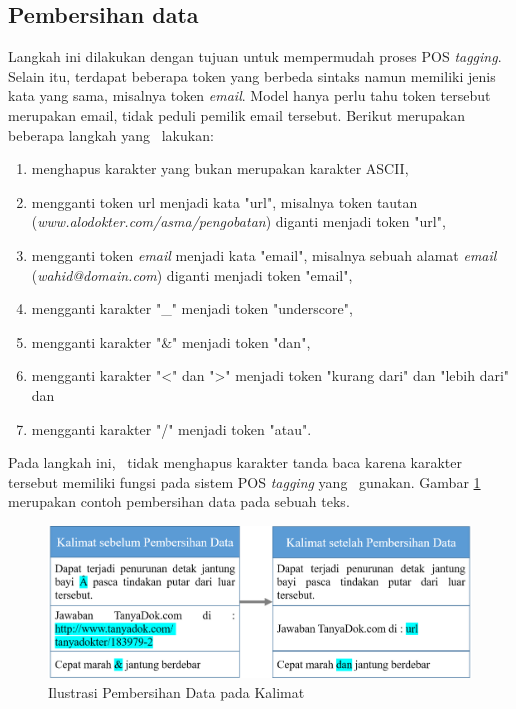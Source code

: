 \subsection{Pembersihan data}
Langkah ini dilakukan dengan tujuan untuk mempermudah proses POS \textit{tagging}. Selain itu, terdapat beberapa token yang berbeda sintaks namun memiliki jenis kata yang sama, misalnya token \textit{email}. Model hanya perlu tahu token tersebut merupakan email, tidak peduli pemilik email tersebut. Berikut merupakan beberapa langkah yang \saya~lakukan:
	
\begin{enumerate}
	\item menghapus karakter yang bukan merupakan karakter ASCII,
	\item mengganti token url menjadi kata "url", misalnya token tautan (\textit{www.alodokter.com/asma/pengobatan}) diganti menjadi token "url",
	\item mengganti token \textit{email} menjadi kata "email", misalnya sebuah alamat \textit{email} (\textit{wahid@domain.com}) diganti menjadi token "email",
	\item mengganti karakter "\_" menjadi token "underscore",
	\item mengganti karakter "\&" menjadi token "dan",
	\item mengganti karakter "\textless" dan "\textgreater" menjadi token "kurang dari" dan "lebih dari" dan
	\item mengganti karakter "/" menjadi token "atau".
\end{enumerate}
Pada langkah ini, \saya~tidak menghapus karakter tanda baca karena karakter tersebut memiliki fungsi pada sistem POS \textit{tagging} yang \saya~gunakan. Gambar \ref{fig:pembersihandata} merupakan contoh pembersihan data pada sebuah teks.
\begin{figure}
	\centering
	\includegraphics[width=\linewidth]{images/pembersihandata}
	\caption{Ilustrasi Pembersihan Data pada Kalimat}
	\label{fig:pembersihandata}
\end{figure}

